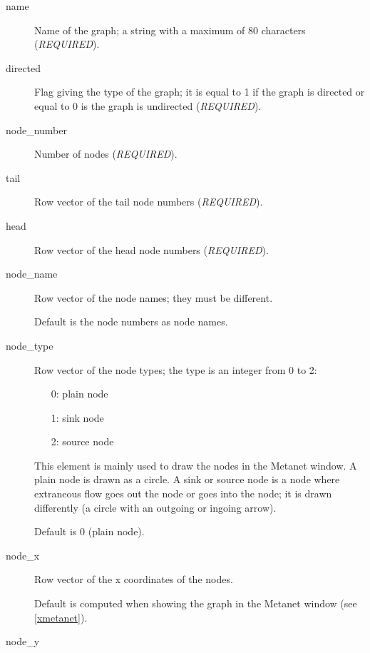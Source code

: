 \documentclass[11pt]{article}
\begin{document}
\begin{description}
  \item[name] 

Name of the graph; a string with a maximum of 80
characters (\emph{REQUIRED}).

  \item[directed]

Flag giving the type of the graph; it is equal to 1 if the graph is
directed or equal to 0 is the graph is undirected (\emph{REQUIRED}).

  \item[node\_number]

Number of nodes (\emph{REQUIRED}).

  \item[tail]

Row vector of the tail node numbers (\emph{REQUIRED}).

  \item[head]

Row vector of the head node numbers (\emph{REQUIRED}).

  \item[node\_name]

Row vector of the node names; they must be different.

Default is the node numbers as node names.

  \item[node\_type]

Row vector of the node types; the type is an integer from 0 to 2:
\begin{itemize}
  \item[0:] plain node
  \item[1:] sink node
  \item[2:] source node
\end{itemize}

This element is mainly used to draw the nodes in the Metanet
window. A plain node is drawn as a circle. A sink or source node is a
node where extraneous flow goes out the node or goes into the node; it
is drawn differently (a circle with an outgoing or ingoing arrow).

Default is 0 (plain node).

  \item[node\_x]

Row vector of the x coordinates of the nodes.

Default is computed when showing the graph in the Metanet window
(see \ref{xmetanet}).

  \item[node\_y]


\end{description}
\end{document}
